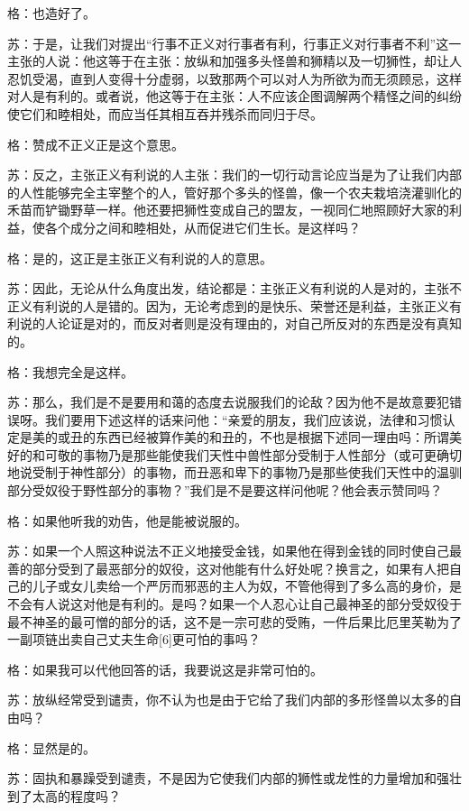 \documentclass[12pt,oneside]{book}
\begin{document}
格：也造好了。

苏：于是，让我们对提出“行事不正义对行事者有利，行事正义对行事者不利”这一主张的人说：他这等于在主张：放纵和加强多头怪兽和狮精以及一切狮性，却让人忍饥受渴，直到人变得十分虚弱，以致那两个可以对人为所欲为而无须顾忌，这样对人是有利的。或者说，他这等于在主张：人不应该企图调解两个精怪之间的纠纷使它们和睦相处，而应当任其相互吞并残杀而同归于尽。

格：赞成不正义正是这个意思。

苏：反之，主张正义有利说的人主张：我们的一切行动言论应当是为了让我们内部的人性能够完全主宰整个的人，管好那个多头的怪兽，像一个农夫栽培浇灌驯化的禾苗而铲锄野草一样。他还要把狮性变成自己的盟友，一视同仁地照顾好大家的利益，使各个成分之间和睦相处，从而促进它们生长。是这样吗？

格：是的，这正是主张正义有利说的人的意思。

苏：因此，无论从什么角度出发，结论都是：主张正义有利说的人是对的，主张不正义有利说的人是错的。因为，无论考虑到的是快乐、荣誉还是利益，主张正义有利说的人论证是对的，而反对者则是没有理由的，对自己所反对的东西是没有真知的。

格：我想完全是这样。

苏：那么，我们是不是要用和蔼的态度去说服我们的论敌？因为他不是故意要犯错误呀。我们要用下述这样的话来问他：“亲爱的朋友，我们应该说，法律和习惯认定是美的或丑的东西已经被算作美的和丑的，不也是根据下述同一理由吗：所谓美好的和可敬的事物乃是那些能使我们天性中兽性部分受制于人性部分（或可更确切地说受制于神性部分）的事物，而丑恶和卑下的事物乃是那些使我们天性中的温驯部分受奴役于野性部分的事物？”我们是不是要这样问他呢？他会表示赞同吗？

格：如果他听我的劝告，他是能被说服的。

苏：如果一个人照这种说法不正义地接受金钱，如果他在得到金钱的同时使自己最善的部分受到了最恶部分的奴役，这对他能有什么好处呢？换言之，如果有人把自己的儿子或女儿卖给一个严厉而邪恶的主人为奴，不管他得到了多么高的身价，是不会有人说这对他是有利的。是吗？如果一个人忍心让自己最神圣的部分受奴役于最不神圣的最可憎的部分的话，这不是一宗可悲的受贿，一件后果比厄里芙勒为了一副项链出卖自己丈夫生命[6]更可怕的事吗？

格：如果我可以代他回答的话，我要说这是非常可怕的。

苏：放纵经常受到谴责，你不认为也是由于它给了我们内部的多形怪兽以太多的自由吗？

格：显然是的。

苏：固执和暴躁受到谴责，不是因为它使我们内部的狮性或龙性的力量增加和强壮到了太高的程度吗？
\end{document}

